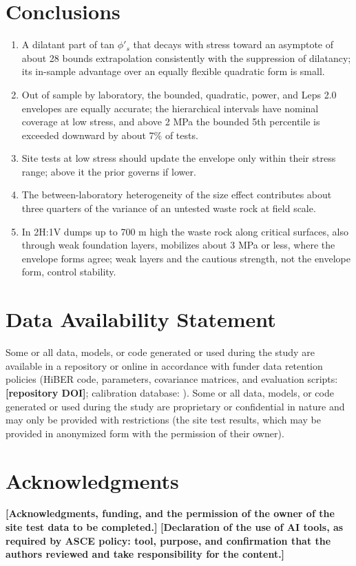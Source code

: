 \documentclass[Journal,letterpaper]{ascelike-new}
\begin{document}
\section{Conclusions}
\begin{enumerate}
\item A dilatant part of tan $\phi'_s$ that decays with stress toward an asymptote of about 28\textdegree{} bounds extrapolation consistently with the suppression of dilatancy; its in-sample advantage over an equally flexible quadratic form is small.
\item Out of sample by laboratory, the bounded, quadratic, power, and Leps 2.0 envelopes are equally accurate; the hierarchical intervals have nominal coverage at low stress, and above 2 MPa the bounded 5th percentile is exceeded downward by about 7\% of tests.
\item Site tests at low stress should update the envelope only within their stress range; above it the prior governs if lower.
\item The between-laboratory heterogeneity of the size effect contributes about three quarters of the variance of an untested waste rock at field scale.
\item In 2H:1V dumps up to 700 m high the waste rock along critical surfaces, also through weak foundation layers, mobilizes about 3 MPa or less, where the envelope forms agree; weak layers and the cautious strength, not the envelope form, control stability.
\end{enumerate}
\section{Data Availability Statement}
\noindent Some or all data, models, or code generated or used during the study are available in a repository or online in accordance with funder data retention policies (HiBER code, parameters, covariance matrices, and evaluation scripts: \textbf{[repository DOI]}; calibration database: ). Some or all data, models, or code generated or used during the study are proprietary or confidential in nature and may only be provided with restrictions (the site test results, which may be provided in anonymized form with the permission of their owner).

\section{Acknowledgments}
\noindent \textbf{[Acknowledgments, funding, and the permission of the owner of the site test data to be completed.]} \textbf{[Declaration of the use of AI tools, as required by ASCE policy: tool, purpose, and confirmation that the authors reviewed and take responsibility for the content.]}
\end{document}
